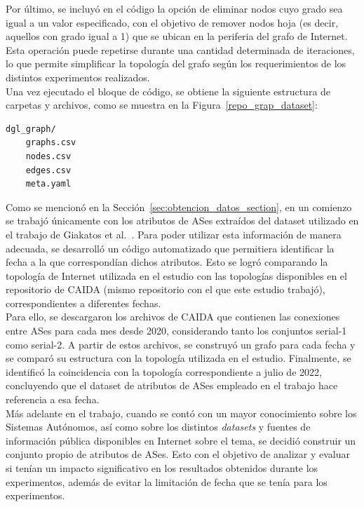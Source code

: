 Por último, se incluyó en el código la opción de eliminar nodos cuyo grado sea igual a un valor especificado, con el objetivo de remover nodos hoja (es decir, aquellos con grado igual a 1) que se ubican en la periferia del grafo de Internet. Esta operación puede repetirse durante una cantidad determinada de iteraciones, lo que permite simplificar la topología del grafo según los requerimientos de los distintos experimentos realizados.\\

Una vez ejecutado el bloque de código, se obtiene la siguiente estructura de carpetas y archivos, como se muestra en la Figura~\ref{repo_grap_dataset}:\\

{
\renewcommand{\lstlistingname}{Formato}
\begin{lstlisting}[basicstyle=\ttfamily,label=repo_grap_dataset ,frame=single, caption=Estructura del repositorio del \textit{benchmark}]
dgl_graph/
    graphs.csv
    nodes.csv
    edges.csv
    meta.yaml
\end{lstlisting}
}

Como se mencionó en la Sección~\ref{sec:obtencion_datos_section}, en un comienzo se trabajó únicamente con los atributos de ASes extraídos del dataset utilizado en el trabajo de Giakatos et al.~\cite{BenchmarkingGNN}. Para poder utilizar esta información de manera adecuada, se desarrolló un código automatizado que permitiera identificar la fecha a la que correspondían dichos atributos. Esto se logró comparando la topología de Internet utilizada en el estudio con las topologías disponibles en el repositorio de CAIDA\cite{CAIDAS-relationship} (mismo repositorio con el que este estudio trabajó), correspondientes a diferentes fechas.\\

Para ello, se descargaron los archivos de CAIDA que contienen las conexiones entre ASes para cada mes desde 2020, considerando tanto los conjuntos serial-1 como serial-2. A partir de estos archivos, se construyó un grafo para cada fecha y se comparó su estructura con la topología utilizada en el estudio. Finalmente, se identificó la coincidencia con la topología correspondiente a julio de 2022, concluyendo que el dataset de atributos de ASes empleado en el trabajo hace referencia a esa fecha.\\

Más adelante en el trabajo, cuando se contó con un mayor conocimiento sobre los Sistemas Autónomos, así como sobre los distintos \textit{datasets} y fuentes de información pública disponibles en Internet sobre el tema, se decidió construir un conjunto propio de atributos de ASes. Esto con el objetivo de analizar y evaluar si tenían un impacto significativo en los resultados obtenidos durante los experimentos, además de evitar la limitación de fecha que se tenía para los experimentos.\\

